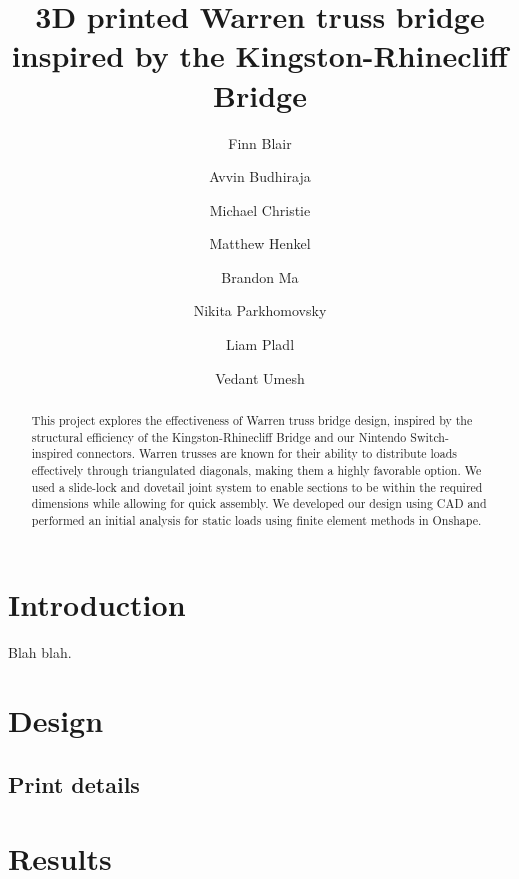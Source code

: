 \documentclass[Preprint,10pt]{ascelike}
\begin{document}
%
\title{3D printed Warren truss bridge inspired by the Kingston-Rhinecliff Bridge}
%
\author[1]{Finn Blair}
\author[1]{Avvin Budhiraja}
\author[1]{Michael Christie}
\author[1]{Matthew Henkel}
\author[1]{Brandon Ma}
\author[1]{Nikita Parkhomovsky}
\author[1]{Liam Pladl}
\author[1]{Vedant Umesh}
%
\maketitle
%
\begin{abstract}
This project explores the effectiveness of Warren truss bridge design, inspired by the structural efficiency of the Kingston-Rhinecliff Bridge and our Nintendo Switch-inspired connectors. Warren trusses are known for their ability to distribute loads effectively through triangulated diagonals, making them a highly favorable option. We used a slide-lock and dovetail joint system to enable sections to be within the required dimensions while allowing for quick assembly. We developed our design using CAD and performed an initial analysis for static loads using finite element methods in Onshape.
\end{abstract}
%
%
\section{Introduction}\label{sec:Introduction}
Blah blah. 

\section{Design}
\subsection{Print details}

\section{Results}
\end{document}
